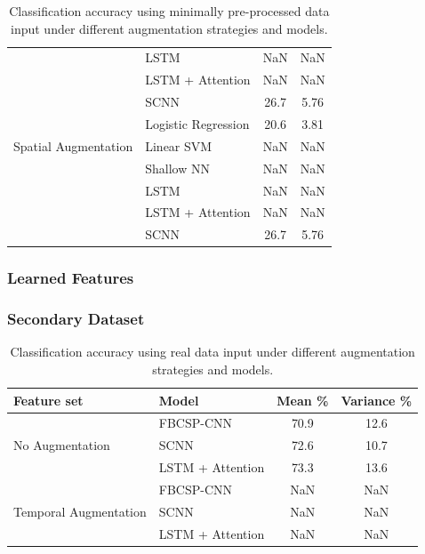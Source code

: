 \documentclass[utf8]{frontiersSCNS} %
\begin{document}
\begin{table}[t]
\begin{tabular}{l l | c | c}
                         & LSTM                & NaN & NaN  \\
                         & LSTM + Attention    & NaN & NaN  \\ 
                         & SCNN                & 26.7 & 5.76  \\
    \midrule
    \multirow{3}{*}{Spatial Augmentation}
                         & Logistic Regression & 20.6 & 3.81  \\
                         & Linear SVM          & NaN & NaN  \\
                         & Shallow NN          & NaN & NaN  \\
                         & LSTM                & NaN & NaN  \\
                         & LSTM + Attention    & NaN & NaN  \\ 
                         & SCNN                & 26.7 & 5.76  \\
    
    \bottomrule
  \end{tabular}
  \caption{Classification accuracy using minimally pre-processed data input under different augmentation strategies and models.}
\end{table}

\subsubsection{Learned Features}

\subsubsection{Secondary Dataset}

\begin{table}[t]
  \centering
  \label{tab:end2end_results}
  \begin{tabular}{l l | c | c}
    \toprule
    \textbf{Feature set} & \textbf{Model} & \textbf{Mean \%} & \textbf{Variance \%} \\
    \toprule
    \multirow{3}{*}{No Augmentation}
                         & FBCSP-CNN           & 70.9 & 12.6  \\
                         & SCNN                & 72.6 & 10.7  \\
                         & LSTM + Attention    & 73.3 & 13.6  \\ 
    \midrule
    \multirow{3}{*}{Temporal Augmentation}
                         & FBCSP-CNN           & NaN & NaN  \\
                         & SCNN                & NaN & NaN  \\
                         & LSTM + Attention    & NaN & NaN  \\ 
    \bottomrule
  \end{tabular}
  \caption{Classification accuracy using real data input under different augmentation strategies and models.}
\end{table}
\end{document}
